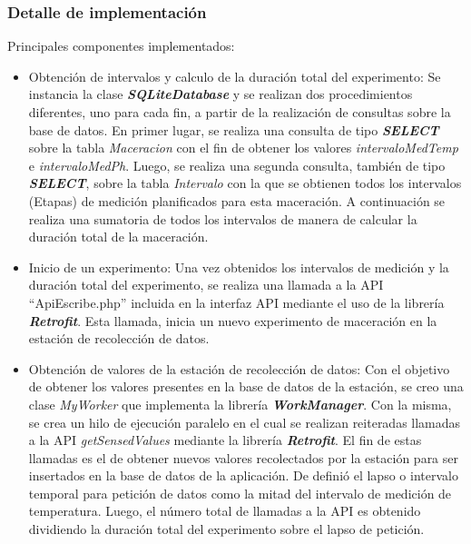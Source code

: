             \subsubsection{Detalle de implementación}
            \par Principales componentes implementados:
            \begin{itemize}
                \item  Obtención de intervalos y calculo de la duración total del experimento: Se instancia la clase \textbf{\textit{\gls{SQLiteDatabase}}} y se realizan dos procedimientos diferentes, uno para cada fin, a partir de la realización de consultas sobre la base de datos. En primer lugar, se realiza una consulta de tipo \textbf{\textit{\gls{SELECT}}} sobre la tabla \textit{Maceracion} con el fin de obtener los valores \textit{intervaloMedTemp} e \textit{intervaloMedPh}. Luego, se realiza una segunda consulta, también de tipo \textbf{\textit{\gls{SELECT}}}, sobre la tabla \textit{Intervalo} con la que se obtienen todos los intervalos (Etapas) de medición planificados para esta maceración. A continuación se realiza una sumatoria de todos los intervalos de manera de calcular la duración total de la maceración.
                
                \item Inicio de un experimento: Una vez obtenidos los intervalos de medición y la duración total del experimento, se realiza una llamada a la API ``ApiEscribe.php'' incluida en la interfaz API mediante el uso de la librería \textbf{\textit{\gls{Retrofit}}}. Esta llamada, inicia un nuevo experimento de maceración en la estación de recolección de datos.
                
                \item Obtención de valores de la estación de recolección de datos: Con el objetivo de obtener los valores presentes en la base de datos de la estación, se creo una clase \textit{MyWorker} que implementa la librería \textbf{\textit{\gls{WorkManager}}}. Con la misma, se crea un hilo de ejecución paralelo en el cual se realizan reiteradas llamadas a la API \textit{getSensedValues} mediante la librería \textbf{\textit{\gls{Retrofit}}}. El fin de estas llamadas es el de obtener nuevos valores recolectados por la estación para ser insertados en la base de datos de la aplicación. De definió el lapso o intervalo temporal para petición de datos como la mitad del intervalo de medición de temperatura. Luego, el número total de llamadas a la API es obtenido dividiendo la duración total del experimento sobre el lapso de petición.
                

\end{itemize}
